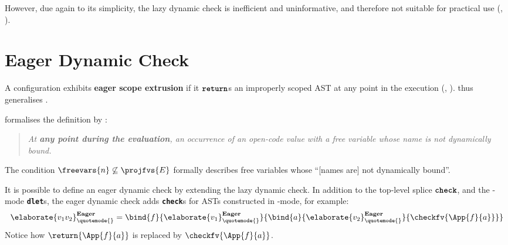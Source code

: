 However, due again to its simplicity, the lazy dynamic check is inefficient and uninformative, and therefore not suitable for practical use \citep{kiselyov-14} (, ).

\section{Eager Dynamic Check}\label{section:eager-dynamic-check-formal}
A configuration exhibits \textbf{eager scope extrusion} if it $\textbf{\texttt{return}}$s an improperly scoped AST at any point in the execution (, ).  thus generalises . 



 formalises the definition by \citet{kiselyov-14}:
\begin{quote}
  \textit{At \textbf{any point during the evaluation}, an occurrence of an open-code value with a free variable whose name is not dynamically bound.}
\end{quote}
The condition $\freevars{n} \not\subseteq \projfvs{E}$ formally describes free variables whose ``[names are] not dynamically bound''.

It is possible to define an eager dynamic check by extending the lazy dynamic check. In addition to the top-level splice $\textbf{\texttt{check}}$, and the \compilemode{}-mode \textbf{\texttt{dlet}}s, the eager dynamic check adds \textbf{\texttt{check}}s for ASTs constructed in \quotemode{}-mode, for example: 
\[\elaborate{v_1 v_2}_{\quotemode{}}^{\textbf{Eager}} = \bind{f}{\elaborate{v_1}_{\quotemode{}}^{\textbf{Eager}}}{\bind{a}{\elaborate{v_2}_{\quotemode{}}^{\textbf{Eager}}}{\checkfv{\App{f}{a}}}}\]
Notice how $\return{\App{f}{a}}$ is replaced by $\checkfv{\App{f}{a}}$. 

